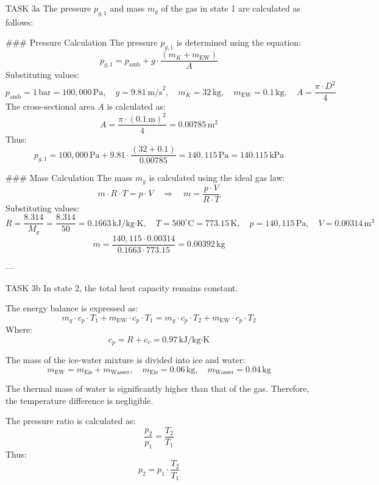 TASK 3a  
The pressure \( p_{g,1} \) and mass \( m_g \) of the gas in state 1 are calculated as follows:  

### Pressure Calculation  
The pressure \( p_{g,1} \) is determined using the equation:  
\[
p_{g,1} = p_{\text{amb}} + g \cdot \frac{(m_K + m_{\text{EW}})}{A}
\]  
Substituting values:  
\[
p_{\text{amb}} = 1 \, \text{bar} = 100,000 \, \text{Pa}, \quad g = 9.81 \, \text{m/s}^2, \quad m_K = 32 \, \text{kg}, \quad m_{\text{EW}} = 0.1 \, \text{kg}, \quad A = \frac{\pi \cdot D^2}{4}
\]  
The cross-sectional area \( A \) is calculated as:  
\[
A = \frac{\pi \cdot (0.1 \, \text{m})^2}{4} = 0.00785 \, \text{m}^2
\]  
Thus:  
\[
p_{g,1} = 100,000 \, \text{Pa} + 9.81 \cdot \frac{(32 + 0.1)}{0.00785} = 140,115 \, \text{Pa} = 140.115 \, \text{kPa}
\]  

### Mass Calculation  
The mass \( m_g \) is calculated using the ideal gas law:  
\[
m \cdot R \cdot T = p \cdot V \quad \Rightarrow \quad m = \frac{p \cdot V}{R \cdot T}
\]  
Substituting values:  
\[
R = \frac{8.314}{M_g} = \frac{8.314}{50} = 0.1663 \, \text{kJ/kg·K}, \quad T = 500^\circ\text{C} = 773.15 \, \text{K}, \quad p = 140,115 \, \text{Pa}, \quad V = 0.00314 \, \text{m}^3
\]  
\[
m = \frac{140,115 \cdot 0.00314}{0.1663 \cdot 773.15} = 0.00392 \, \text{kg}
\]  

---

TASK 3b  
In state 2, the total heat capacity remains constant.  

The energy balance is expressed as:  
\[
m_g \cdot c_p \cdot T_1 + m_{\text{EW}} \cdot c_p \cdot T_1 = m_g \cdot c_p \cdot T_2 + m_{\text{EW}} \cdot c_p \cdot T_2
\]  
Where:  
\[
c_p = R + c_v = 0.97 \, \text{kJ/kg·K}
\]  

The mass of the ice-water mixture is divided into ice and water:  
\[
m_{\text{EW}} = m_{\text{Eis}} + m_{\text{Wasser}}, \quad m_{\text{Eis}} = 0.06 \, \text{kg}, \quad m_{\text{Wasser}} = 0.04 \, \text{kg}
\]  

The thermal mass of water is significantly higher than that of the gas. Therefore, the temperature difference is negligible.  

The pressure ratio is calculated as:  
\[
\frac{p_2}{p_1} = \frac{T_2}{T_1}
\]  
Thus:  
\[
p_2 = p_1 \cdot \frac{T_2}{T_1}
\]  

